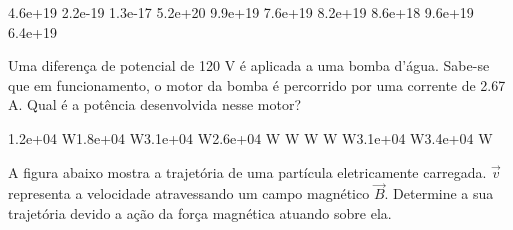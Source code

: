 \documentclass[12pt, addpoints]{exam}
\begin{document}
\begin{questions}
\begin{multicols*}{2}
\begin{oneparchoices}
\choice 4.6e+19 \choice 2.2e-19 \choice 1.3e-17 \choice 5.2e+20 \choice 9.9e+19 \choice 7.6e+19 \choice 8.2e+19 \choice 8.6e+18 \choice 9.6e+19 \choice 6.4e+19 
\end{oneparchoices}\question Uma diferença de potencial de 120 V é aplicada a uma bomba d’água. Sabe-se que em funcionamento, o motor da bomba é percorrido por uma corrente de    2.67 A. Qual é a potência desenvolvida nesse motor?

\begin{oneparchoices}
\choice 1.2e+04 W\choice 1.8e+04 W\choice 3.1e+04 W\choice 2.6e+04 W W W W W\choice 3.1e+04 W\choice 3.4e+04 W
\end{oneparchoices}\question A ﬁgura abaixo mostra a trajetória de uma partícula eletricamente carregada. $\vec{{v}}$ representa a velocidade atravessando um campo magnético $\vec{{B}}$. Determine a sua trajetória devido a ação da força magnética atuando sobre ela.
        
        \begin{center}
            \begin{minipage}[c]{0.5\linewidth}
            \end{minipage}
        \end{center}

        


\end{multicols*}
\end{questions}
\end{document}
